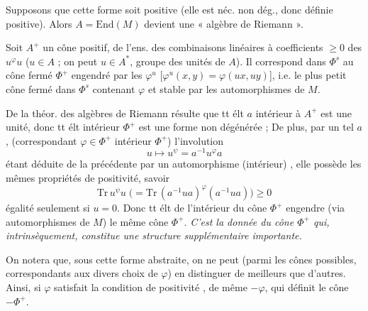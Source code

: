 \documentclass[11pt,a4paper]{article}
\begin{document}
Supposons que cette forme soit  positive (elle est néc.
non dég., donc définie positive).  Alors
$A = \mathrm{End}(M)$ devient une « algèbre de Riemann ».

Soit $A^{+}$ un cône positif,   de
l'ens. des combinaisons linéaires à coefficients $\geqslant 0$ des
$u^{\varphi} u$ ($u \in A$ ; on peut  $u \in A^{*}$,
groupe des unités de $A$). Il correspond dans $\Phi^{s}$ au cône fermé
$\Phi^{+}$ engendré par les $\varphi^{u}$ [$\varphi^{u}(x,y) =
\varphi(ux, uy)$], i.e. le plus petit cône fermé dans $\Phi^{s}$ contenant
$\varphi$ et stable par les automorphismes de $M$.

 De la théor. des algèbres de Riemann résulte que
tt élt $a$ intérieur à $A^{+}$ est une unité, donc tt élt intérieur
 $\Phi^{+}$ est une forme non dégénérée ; \struck{\ill{}} De
plus, par un tel $a$,  (correspondant  $\varphi \in \Phi^{+}$ intérieur
 $\Phi^{+}$) l'involution
\[
u \mapsto u^{\psi} = a^{-1} u^{\varphi} a
\]
 étant déduite
de la précédente par un automorphisme (intérieur) \ill{}, elle
\struck{\ill{}} possède
les mêmes propriétés de positivité, savoir
\[
\mathrm{Tr}\, u^{\psi} u \;\bigl(= \mathrm{Tr}\, (a^{-1}ua)^{\varphi}
(a^{-1}ua)\bigr) \geqslant 0
\]
égalité seulement si $u = 0$. Donc tt élt de l'intérieur du cône
 $\Phi^{+}$ engendre (via automorphismes de $M$) le même cône
$\Phi^{+}$. \emph{C'est la donnée du cône $\Phi^{+}$ qui, intrinsèquement,
constitue une structure supplémentaire importante.}


On notera que, sous cette forme abstraite, on ne peut (parmi les cônes
possibles, correspondants aux divers choix de $\varphi$) en distinguer de
meilleurs que d'autres. Ainsi, si $\varphi$ satisfait la condition de
positivité \ill{}, de même $-\varphi$, qui définit le cône $-\Phi^{+}$.
\end{document}
